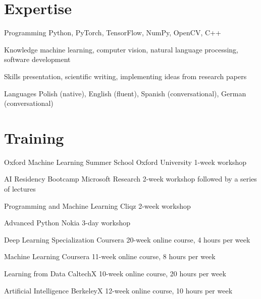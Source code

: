 \documentclass[]{friggeri-cv_osx}
\begin{document}
\section{Expertise}
\begin{entrylist}
\entry
{}
{Programming}
{}
{Python, PyTorch, TensorFlow, NumPy, OpenCV, C++}

\entry
{}
{Knowledge}
{}
{machine learning, computer vision, natural language processing, software development}

\entry
{}
{Skills}
{}
{presentation, scientific writing, implementing ideas from research papers}

\entry
{}
{Languages}
{}
{Polish (native), English (fluent), Spanish (conversational), German (conversational)}
\end{entrylist}

\section{Training}
\begin{entrylist}
\entry
{}
{Oxford Machine Learning Summer School}
{Oxford University}
{1-week workshop}

\entry
{}
{AI Residency Bootcamp}
{Microsoft Research}
{2-week workshop followed by a series of lectures}

\entry
{}
{Programming and Machine Learning}
{Cliqz}
{2-week workshop}

\entry
{}
{Advanced Python}
{Nokia}
{3-day workshop}

\entry
{}
{Deep Learning Specialization}
{Coursera}
{20-week online course, 4 hours per week}

\entry
{}
{Machine Learning}
{Coursera}
{11-week online course, 8 hours per week}

\entry
{}
{Learning from Data}
{CaltechX}
{10-week online course, 20 hours per week}

\entry
{}
{Artificial Intelligence}
{BerkeleyX}
{12-week online course, 10 hours per week}
\end{entrylist}
\end{document}
